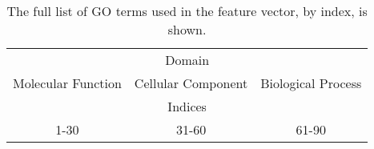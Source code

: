 \begin{table}
    \centering
    \begin{tabular}{c c c}
        \multicolumn{3}{c}{Domain} \\
        Molecular Function & Cellular Component & Biological Process \\
        \multicolumn{3}{c}{Indices} \\
        1-30        & 31-60     & 61-90 \\
        \hline

    \end{tabular}
    \caption{The full list of GO terms used in the feature vector, by index, is shown.}
    \label{apptab:extrago}
\end{table}
